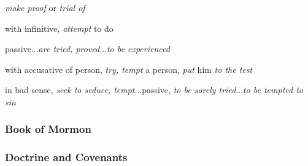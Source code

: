 \begin{compactdesc}
					\item[LSJ 1354b, PDF 1425] \textbf{}
						\begin{compactitem}
							\item[I.1] \textit{make proof} or \textit{trial of}
							\item[I.2] with infinitive, \textit{attempt} to do
							\item[I.3] passive...\textit{are tried, proved}...\textit{to be experienced}
							\item[II.1] with accusative of person, \textit{try, tempt} a person, \textit{put} him \textit{to the test}
							\item[II.2] in bad sense, \textit{seek to seduce, tempt}...passive, \textit{to be sorely tried}...\textit{to be tempted to sin}
						\end{compactitem}
				\end{compactdesc}
				
				
				\begin{compactdesc}
					\item[Some NT uses] \textbf{}
						\begin{compactdesc}
							\item[{\hyperref[MATTHEW-4-1]{Matthew 4:1}}]
						\end{compactdesc}
				\end{compactdesc}
		
	\subsubsection{Book of Mormon} %
		\label{TEMPTATION-BOM}
	
		
		\begin{compactdesc}
			\item[{\hyperref[1NEPHI-12-16]{1 Nephi 12:16}}]
			\item[{\hyperref[3NEPHI-6-17]{3 Nephi 6:17}}]
			\item[{\hyperref[3NEPHI-28-39]{3 Nephi 28:39}}]
		\end{compactdesc}
		
	\subsubsection{Doctrine and Covenants} %
		\label{TEMPTATION-DC}
	
